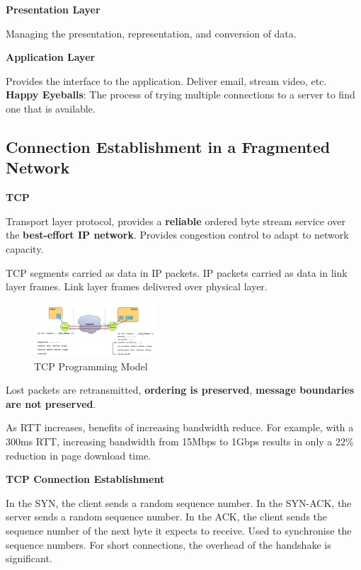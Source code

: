 \documentclass{article}
\begin{document}
\textbf{Presentation Layer}

Managing the presentation, representation, and conversion of data.


\textbf{Application Layer}

Provides the interface to the application. Deliver email, stream video, etc.
\textbf{Happy Eyeballs}: The process of trying multiple connections to a server to find one that is available.


\clearpage

\subsection*{Connection Establishment in a Fragmented Network}

\textbf{TCP}

Transport layer protocol, provides a \textbf{reliable} ordered byte stream service over the \textbf{best-effort IP network}.
Provides congestion control to adapt to network capacity.

TCP segments carried as data in IP packets.
IP packets carried as data in link layer frames.
Link layer frames delivered over physical layer.

\begin{figure}[h]
    \centering
    \includegraphics[width=0.4\textwidth]{assets/tcp-programming-model.png}
    \caption{TCP Programming Model}\label{fig:tcp-programming-model}
\end{figure}

Lost packets are retransmitted, \textbf{ordering is preserved}, \textbf{message boundaries are not preserved}.

As RTT increases, benefits of increasing bandwidth reduce.
For example, with a 300ms RTT, increasing bandwidth from 15Mbps to 1Gbps results in only a 22\% reduction in page download time.

\textbf{TCP Connection Establishment}

In the SYN, the client sends a random sequence number.
In the SYN-ACK, the server sends a random sequence number.
In the ACK, the client sends the sequence number of the next byte it expects to receive.
Used to synchronise the sequence numbers.
For short connections, the overhead of the handshake is significant.
\end{document}
